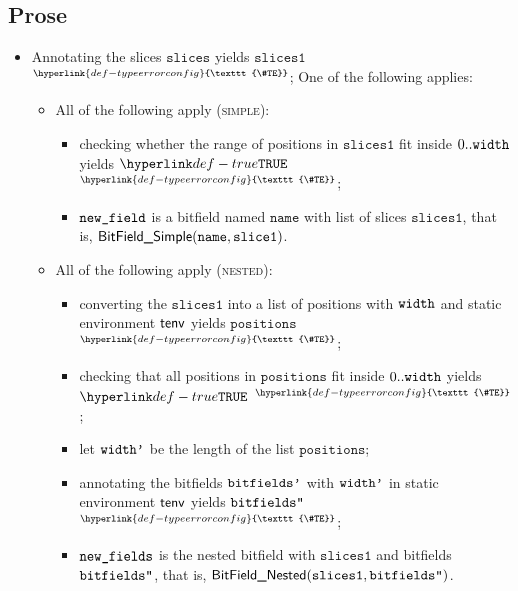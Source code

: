 \documentclass{book}
\newcommand\TypeErrorConfig[0]{\hyperlink{def-typeerrorconfig}{\texttt{\#TE}}}
\newcommand\ProseOrTypeError[0]{\hyperlink{def-proseortypeerror}{$^{\TypeErrorConfig}$}}
\newcommand\slices[0]{\texttt{slices}}
\newcommand\sliceone[0]{\texttt{slice1}}
\newcommand\slicesone[0]{\texttt{slices1}}
\newcommand\positions[0]{\texttt{positions}}
\newcommand\name[0]{\texttt{name}}
\begin{document}
\subsection{Prose}
\begin{itemize}
  \item Annotating the slices $\slices$ yields $\slicesone$ \ProseOrTypeError;
  One of the following applies:
  \begin{itemize}
    \item All of the following apply (\textsc{simple}):
    \begin{itemize}
      \item checking whether the range of positions in $\slicesone$ fit inside $0..\texttt{width}$ yields $\True$ \ProseOrTypeError;
      \item $\texttt{new\_field}$ is a bitfield named $\name$ with list of slices $\slicesone$, that is, $\BitFieldSimple(\name, \sliceone)$.
    \end{itemize}

    \item All of the following apply (\textsc{nested}):
    \begin{itemize}
      \item converting the $\slicesone$ into a list of positions with $\texttt{width}$ and static environment $\textsf{tenv}$
      yields $\positions$ \ProseOrTypeError;
      \item checking that all positions in $\positions$ fit inside $0..\texttt{width}$ yields $\True$ \ProseOrTypeError;
      \item let $\texttt{width'}$ be the length of the list $\positions$;
      \item annotating the bitfields $\texttt{bitfields'}$ with $\texttt{width'}$ in static environment $\textsf{tenv}$ yields $\texttt{bitfields''}$ \ProseOrTypeError;
      \item $\texttt{new\_fields}$ is the nested bitfield with $\slicesone$ and bitfields $\texttt{bitfields''}$, that is, $\BitFieldNested(\slicesone, \bitfieldspp)$.
    \end{itemize}


\end{itemize}
\end{itemize}
\end{document}
